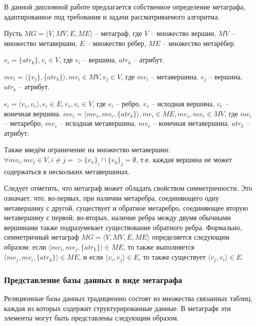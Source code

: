В данной дипломной работе предлагается собственное определение метаграфа, адаптированное под требования и задачи рассматриваемого алгоритма.

Пусть $MG = \langle V, MV, E, ME \rangle$ -- метаграф, где $V$ -- множество вершин, $MV$ -- множество метавершин, $E$ -- множество рёбер, $ME$ -- множество метарёбер.

$v_i = \{atr_k\}, v_i \in V$, где $v_i$ -- вершина, $atr_k$ -- атрибут.

$mv_i = \langle \{v_j\}, \{atr_k\} \rangle, mv_i \in MV, v_j \in V$, где $mv_i$ -- метавершина, $v_j$ -- вершина, $atr_k$ -- атрибут.

$e_i = \langle v_s, v_e \rangle, e_i \in E, v_s, v_e \in V$, где $e_i$ -- ребро, $v_s$ -- исходная вершина, $v_e$ -- конечная вершина.
$me_i = \langle mv_s, mv_e, \{atr_k\} \rangle, me_i \in ME, mv_s, mv_e \in MV$, где $me_i$ -- метаребро, $mv_s$ -- исходная метавершина, $mv_e$ -- конечная метавершина, $atr_k$ -- атрибут.

Также введём ограничение на множество метавершин: $\forall mv_i, mv_j \in V, i \neq j => \{v_x\}_i \cap \{v_y\}_j = \emptyset$, т.е. каждая вершина не может содержаться в нескольких метавершинах.

Следует отметить, что метаграф может обладать свойством симметричности. Это означает, что, во-первых, при наличии метаребра, соединяющего одну метавершину с другой, существует и обратное метаребро, соединяющее вторую метавершину с первой; во-вторых, наличие ребра между двумя обычными вершинами также подразумевает существование обратного ребра. Формально, симметричный метаграф $MG = \langle V, MV, E, ME \rangle$ определяется следующим образом: если $\langle mv_i, mv_j, \{atr_k\} \rangle \in ME$, то также выполняется $\langle mv_j, mv_i, \{atr_k\} \rangle \in ME$, и если $\langle v_i, v_j \rangle \in E$, то также существует $\langle v_j, v_i \rangle \in E$.

\subsubsection{Представление базы данных в виде метаграфа}

Реляционные базы данных традиционно состоят из множества связанных таблиц, каждая из которых содержит структурированные данные. В метаграфе эти элементы могут быть представлены следующим образом.


